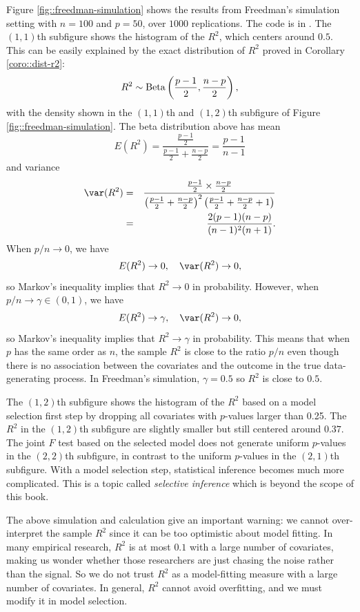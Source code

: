 Figure \ref{fig::freedman-simulation} shows the results from Freedman's simulation setting with $n=100$ and $p=50$, over $1000$ replications. The  code is in . 
The $(1,1)$th subfigure shows the histogram of the $R^2$, which centers around $0.5$. 
This can be easily explained by the exact distribution of $R^{2}$ proved in Corollary \ref{coro::dist-r2}: 
\[
R^{2}\sim\textup{Beta}\left(\frac{p-1}{2},\frac{n-p}{2}\right),
\]
with the density shown in the $(1,1)$th and $(1,2)$th subfigure of Figure \ref{fig::freedman-simulation}. The beta distribution above has mean
\[
E(R^{2})=\frac{\frac{p-1}{2}}{\frac{p-1}{2}+\frac{n-p}{2}}=\frac{p-1}{n-1}
\]
 and variance
\begin{eqnarray*}
\var(R^{2}) 
&=& \frac{\frac{p-1}{2}\times\frac{n-p}{2}}{\left(\frac{p-1}{2}+\frac{n-p}{2}\right)^{2}\left(\frac{p-1}{2}+\frac{n-p}{2}+1\right)} \\
&=&\frac{2(p-1)(n-p)}{(n-1)^{2}(n+1)}.
\end{eqnarray*}
When $p/n\rightarrow0$, we have 
\[
E(R^{2})\rightarrow0,\quad\var(R^{2})\rightarrow0,
\]
so Markov's inequality implies that $R^{2}\rightarrow0$ in probability.
However, when $p/n\rightarrow\gamma\in(0,1)$, we have 
\[
E(R^{2})\rightarrow\gamma,\quad\var(R^{2})\rightarrow0,
\]
so Markov's inequality implies that $R^{2}\rightarrow\gamma$ in probability.
This means that when $p$ has the same order as $n$, the sample
$R^{2}$ is close to the ratio $p/n$ even though there is no association
between the covariates and the outcome in the true data-generating
process. In Freedman's simulation, $\gamma=0.5$ so $R^{2}$ is close
to $0.5$. 


The $(1,2)$th subfigure shows the histogram of the $R^2$ based on a model selection first step by dropping all covariates with $p$-values larger than 0.25. The $R^2$ in the $(1,2)$th subfigure are slightly smaller but still centered around $0.37$. The joint $F$ test based on the selected model does not generate uniform $p$-values in the $(2,2)$th subfigure, in contrast to the uniform $p$-values in the $(2,1)$th subfigure. With a model selection step, statistical inference becomes much more complicated. This is a topic called {\it selective inference} which is beyond the scope of this book. 




The above simulation and calculation give an important warning: we cannot
over-interpret the sample $R^{2}$ since it can be too optimistic
about model fitting. In many empirical research, $R^{2}$ is at most
$0.1$ with a large number of covariates, making us wonder whether those researchers are just chasing the noise rather than the signal. So we do not trust $R^{2}$ as a model-fitting measure with a
large number of covariates. In general, $R^2$ cannot avoid overfitting, and we must modify it in model selection. 





